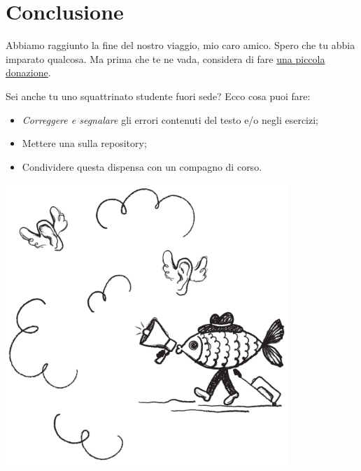 \section*{Conclusione}

Abbiamo raggiunto la fine del nostro viaggio, mio caro amico.
Spero che tu abbia imparato qualcosa.
Ma prima che te ne vada, considera di fare \href{https://paypal.me/pools/c/85MUW0ex8l}{una piccola donazione{\ExternalLink}}.

\medskip
Sei anche tu uno squattrinato studente fuori sede?
Ecco cosa puoi fare:
\begin{itemize}
	\item \emph{Correggere e segnalare} gli errori contenuti del testo e/o negli esercizi;
	\item Mettere una  sulla repository;
	\item Condividere questa dispensa con un compagno di corso.
\end{itemize}

\hfill
\begin{minipage}[c]{.5\textwidth}
\centering
	\includegraphics[width=0.8\textwidth]{assets/figures/absurd-06}
\end{minipage}
